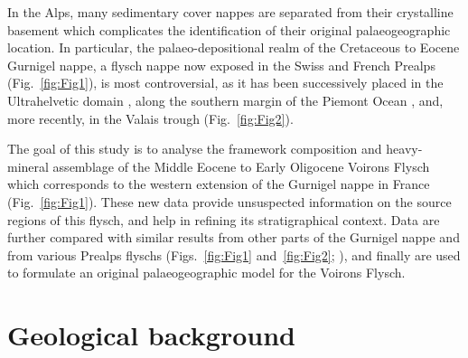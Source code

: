 \documentclass[twoside]{article}
\begin{document}
In the Alps, many sedimentary cover nappes are separated from their crystalline basement which complicates the identification of their original palaeogeographic location. In particular, the palaeo-depositional realm of the Cretaceous to Eocene Gurnigel nappe, a flysch nappe now exposed in the Swiss and French Prealps (Fig.~\ref{fig:Fig1}), is most controversial, as it has been successively placed in the Ultrahelvetic domain \citep{Lombard1940a,Hsu1960,Trumpy1960,Hubert1967,Hsu1971}, along the southern margin of the Piemont Ocean \citep{Caron1976,Winkler1983,Winkler1984}, and, more recently, in the Valais trough \citep{Trumpy2006,Ospina-Ostios2013,Ragusa2015} (Fig.~\ref{fig:Fig2}).\par
\medskip
The goal of this study is to analyse the framework composition and heavy-mineral assemblage of the Middle Eocene to Early Oligocene Voirons Flysch which corresponds to the western extension of the Gurnigel nappe in France (Fig.~\ref{fig:Fig1}). These new data provide unsuspected information on the source regions of this flysch, and help in refining its stratigraphical context. Data are further compared with similar results from other parts of the Gurnigel nappe and from various Prealps flyschs (Figs.~\ref{fig:Fig1} and~\ref{fig:Fig2}; \citealp{Caron1989}), and finally are used to formulate an original palaeogeographic model for the Voirons Flysch.\par


\section{Geological background}
\end{document}
